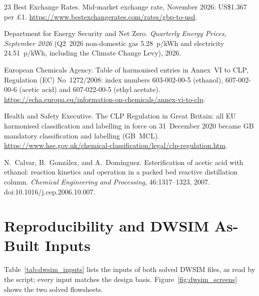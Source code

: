 \documentclass[10pt,a4paper]{article}
\begin{document}
\begin{thebibliography}{23}
 Best Exchange Rates. Mid-market exchange rate, November 2026: US\$1.367 per \pounds 1. \url{https://www.bestexchangerates.com/rates/gbp-to-usd}.

 Department for Energy Security and Net Zero. \textit{Quarterly Energy Prices, September 2026} (Q2~2026 non-domestic gas 5.28~p/kWh and electricity 24.51~p/kWh, including the Climate Change Levy), 2026.

 European Chemicals Agency. Table of harmonised entries in Annex~VI to CLP, Regulation (EC) No~1272/2008: index numbers 603-002-00-5 (ethanol), 607-002-00-6 (acetic acid) and 607-022-00-5 (ethyl acetate). \url{https://echa.europa.eu/information-on-chemicals/annex-vi-to-clp}.

 Health and Safety Executive. The CLP Regulation in Great Britain: all EU harmonised classification and labelling in force on 31~December 2020 became GB mandatory classification and labelling (GB~MCL). \url{https://www.hse.gov.uk/chemical-classification/legal/clp-regulation.htm}.

 N.~Calvar, B.~Gonz\'alez, and A.~Dom\'inguez. Esterification of acetic acid with ethanol: reaction kinetics and operation in a packed bed reactive distillation column. \textit{Chemical Engineering and Processing}, 46:1317--1323, 2007. doi:10.1016/j.cep.2006.10.007.

\end{thebibliography}
\endgroup

\newpage
\appendix
\section{Reproducibility and DWSIM As-Built Inputs}

Table~\ref{tab:dwsim_inputs} lists the inputs of both solved DWSIM files, as read by the script; every input matches the design basis. Figure~\ref{fig:dwsim_screens} shows the two solved flowsheets.
\end{document}
